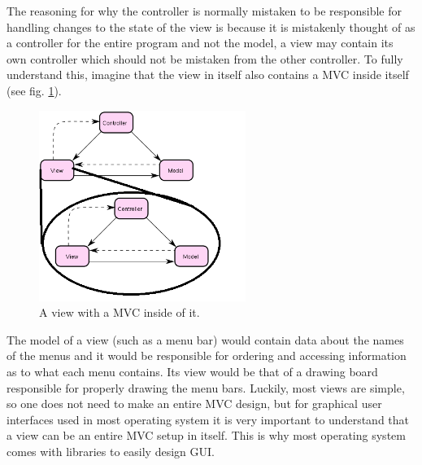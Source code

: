 The reasoning for why the controller is normally mistaken to be responsible
for handling changes to the state of the view is because it is mistakenly
thought of as a controller for the entire program and not the model,
a view may contain its own controller which should not be mistaken
from the other controller. To fully understand this, imagine that
the view in itself also contains a MVC inside itself (see fig. \ref{fig:MVCeption}).

\begin{figure}[h]
\begin{centering}
\includegraphics[width=0.6\textwidth]{MVCeption}
\par\end{centering}

\caption{\label{fig:MVCeption}A view with a MVC inside of it.}
\end{figure}


The model of a view (such as a menu bar) would contain data about
the names of the menus and it would be responsible for ordering and
accessing information as to what each menu contains. Its view would
be that of a drawing board responsible for properly drawing the menu
bars. Luckily, most views are simple, so one does not need to make
an entire MVC design, but for graphical user interfaces used in most
operating system it is very important to understand that a view can
be an entire MVC setup in itself. This is why most operating system
comes with libraries to easily design GUI.
